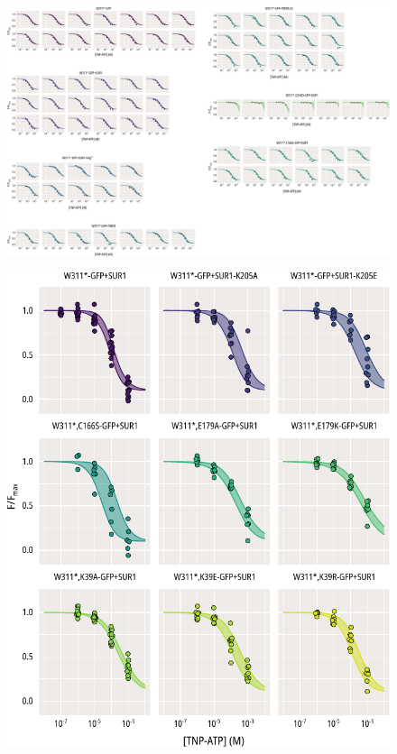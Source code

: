 \begin{figure}[h]
	\centering
	\includegraphics[width=\textwidth]{all_unroofed_fits_2.pdf}
	\caption[Unroofed membrane quenching sample hill fits]{
	}
	\label{apxfig:unroofed_2}
\end{figure}

\begin{figure}[h]
	\centering
	\includegraphics[width=\textwidth]{all_pcf_fits_3.pdf}
	\caption[Excised patch quenching population hill fits]{
	}
	\label{apxfig:pcf_1}
\end{figure}

